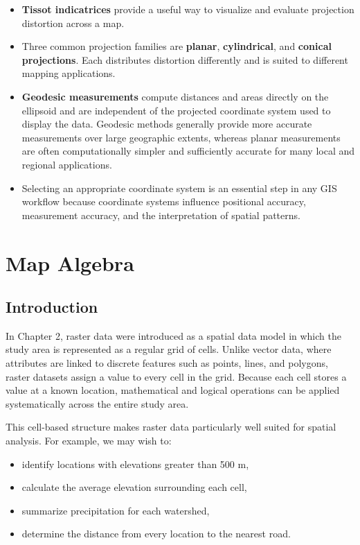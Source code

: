 \documentclass[
  letterpaper,
]{book}
\providecommand{\tightlist}{%
  \setlength{\itemsep}{0pt}\setlength{\parskip}{0pt}}
\begin{document}
\begin{itemize}
  distance are \textbf{equidistant}, and those that preserve direction
  are \textbf{azimuthal}.
\item
  \textbf{Tissot indicatrices} provide a useful way to visualize and
  evaluate projection distortion across a map.
\item
  Three common projection families are \textbf{planar},
  \textbf{cylindrical}, and \textbf{conical projections}. Each
  distributes distortion differently and is suited to different mapping
  applications.
\item
  \textbf{Geodesic measurements} compute distances and areas directly on
  the ellipsoid and are independent of the projected coordinate system
  used to display the data. Geodesic methods generally provide more
  accurate measurements over large geographic extents, whereas planar
  measurements are often computationally simpler and sufficiently
  accurate for many local and regional applications.
\item
  Selecting an appropriate coordinate system is an essential step in any
  GIS workflow because coordinate systems influence positional accuracy,
  measurement accuracy, and the interpretation of spatial patterns.
\end{itemize}

\chapter{Map Algebra}\label{map-algebra}

\section{Introduction}\label{introduction-9}

In Chapter 2, raster data were introduced as a spatial data model in
which the study area is represented as a regular grid of cells. Unlike
vector data, where attributes are linked to discrete features such as
points, lines, and polygons, raster datasets assign a value to every
cell in the grid. Because each cell stores a value at a known location,
mathematical and logical operations can be applied systematically across
the entire study area.

This cell-based structure makes raster data particularly well suited for
spatial analysis. For example, we may wish to:

\begin{itemize}
\tightlist
\item
  identify locations with elevations greater than 500 m,
\item
  calculate the average elevation surrounding each cell,
\item
  summarize precipitation for each watershed,
\item
  determine the distance from every location to the nearest road.
\end{itemize}
\end{document}
